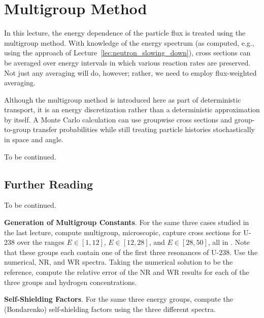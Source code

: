 \chapter{Multigroup Method}
\label{lec:multigroup_method}

In this lecture, the energy dependence of the particle flux is 
treated using the multigroup method.  With knowledge of the 
energy spectrum (as computed, e.g., using the approach of 
Lecture~\ref{lec:neutron_slowing_down}), cross sections can be 
averaged over energy intervals in which various reaction 
rates are preserved.  Not just any averaging will do, however; rather, we
need to employ flux-weighted averaging.

Although the multigroup method is introduced here as part of deterministic
transport, it is an energy discretization rather than a deterministic
approximation by itself.  A Monte Carlo calculation can use groupwise
cross sections and group-to-group transfer probabilities while still treating
particle histories stochastically in space and angle.

To be continued.

\section*{Further Reading}

To be continued.

\begin{exercises}

  \item \textbf{Generation of Multigroup Constants}.
    For the same three cases studied in the last lecture, 
    compute multigroup, microscopic, capture 
    cross sections for U-238 over the 
    ranges $E\in[1, 12]$, $E\in[12, 28]$, and $E\in [28, 50]$, all in 
    \electronvolt.  Note that these groups each contain one of the 
    first three resonances of U-238.  
    Use the numerical, NR, and WR spectra.  Taking 
    the numerical solution to be the reference, compute the relative 
    error of the NR and WR results for each of the three groups and
    hydrogen concentrations.
    
  \item \textbf{Self-Shielding Factors}.
    For the same three energy groups, compute the (Bondarenko) self-shielding 
    factors using the three different spectra.
    
  
\end{exercises}

